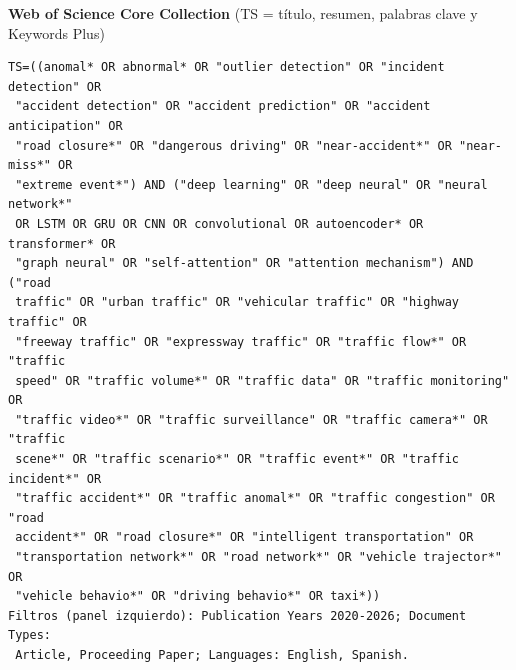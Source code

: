 \documentclass[12pt, a4paper]{article}
\begin{document}
{\noindent\textbf{Web of Science Core Collection} (TS = t\'{i}tulo, resumen, palabras clave y Keywords Plus)
\begin{verbatim}
TS=((anomal* OR abnormal* OR "outlier detection" OR "incident detection" OR
 "accident detection" OR "accident prediction" OR "accident anticipation" OR
 "road closure*" OR "dangerous driving" OR "near-accident*" OR "near-miss*" OR
 "extreme event*") AND ("deep learning" OR "deep neural" OR "neural network*"
 OR LSTM OR GRU OR CNN OR convolutional OR autoencoder* OR transformer* OR
 "graph neural" OR "self-attention" OR "attention mechanism") AND ("road
 traffic" OR "urban traffic" OR "vehicular traffic" OR "highway traffic" OR
 "freeway traffic" OR "expressway traffic" OR "traffic flow*" OR "traffic
 speed" OR "traffic volume*" OR "traffic data" OR "traffic monitoring" OR
 "traffic video*" OR "traffic surveillance" OR "traffic camera*" OR "traffic
 scene*" OR "traffic scenario*" OR "traffic event*" OR "traffic incident*" OR
 "traffic accident*" OR "traffic anomal*" OR "traffic congestion" OR "road
 accident*" OR "road closure*" OR "intelligent transportation" OR
 "transportation network*" OR "road network*" OR "vehicle trajector*" OR
 "vehicle behavio*" OR "driving behavio*" OR taxi*))
Filtros (panel izquierdo): Publication Years 2020-2026; Document Types:
 Article, Proceeding Paper; Languages: English, Spanish.
\end{verbatim}

}
\end{document}
